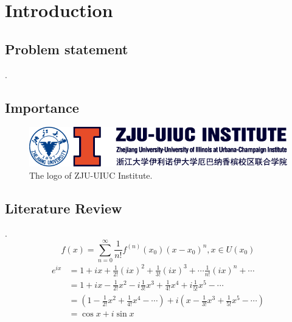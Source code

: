 \documentclass{zjui-report}
\begin{document}
\frontmatter
\makecoverpage

\tableofcontents
\mainmatter

\chapter{Introduction}
\section{Problem statement}
\lipsum[1]\cite{li1999,haynes1951}.
\section{Importance}
\begin{figure}[H]
    \centering
    \includegraphics[width=0.4\linewidth]{LOGO2.png}
    \caption{The logo of ZJU-UIUC Institute.}
    \label{fig:logo}
\end{figure}

\section{Literature Review}
\lipsum[2]\cite{j.a.prufrock2009,li1999,ref1}.
\begin{equation}
    f\left( x \right) =\sum_{n=0}^{\infty}{\frac{1}{n!}f^{\left( n \right)}\left( x_0 \right) \left( x-x_0 \right) ^n}, x\in U\left( x_0 \right)
\end{equation}
\begin{equation}
    \begin{aligned}
        e^{ix} & =1+ix+\frac{1}{2!}\left( ix \right) ^2+\frac{1}{3!}\left( ix \right) ^3+\cdots \frac{1}{n!}\left( ix \right) ^n+\cdots
        \\
               & =1+ix-\frac{1}{2!}x^2-i\frac{1}{3!}x^3+\frac{1}{4!}x^4+i\frac{1}{5!}x^5-\cdots
        \\
               & =\left( 1-\frac{1}{2!}x^2+\frac{1}{4!}x^4-\cdots \right) +i\left( x-\frac{1}{3!}x^3+\frac{1}{5!}x^5-\cdots \right)
        \\
               & =\cos x+i\sin x
    \end{aligned}
\end{equation}
\end{document}
